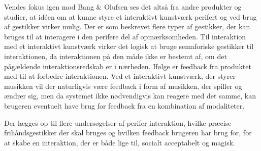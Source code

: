 Vendes fokus igen mod Bang $\&$ Olufsen ses det altså fra andre produkter og studier, at idéen om at kunne styre et interaktivt kunstværk perifert og ved brug af gestikker virker mulig. Der er som beskrevet flere typer af gestikker, der kan bruges til at interagere i den perifere del af opmærksomheden. Til interaktion med et interaktivt kunstværk virker det logisk at bruge semaforiske gestikker til interaktionen, da interaktionen på den måde ikke er bestemt af, om det pågældende interaktionsredskab er i nærheden. Ifølge \textcite[s. 21]{PDF:FacilitatingPIDesignAndEvaluation} er feedback fra produktet med til at forbedre interaktionen. Ved et interaktivt kunstværk, der styrer musikken vil der naturligvis være feedback i form af musikken, der spiller og ændrer sig, men da systemet ikke nødvendigvis kan reagere med det samme, kan brugeren eventuelt have brug for feedback fra en kombination af modaliteter. 

Der lægges op til flere undersøgelser af perifer interaktion, hvilke præcise frihåndsgestikker der skal bruges og hvilken feedback brugeren har brug for, for at skabe en interaktion, der er både lige til, socialt acceptabelt og magisk.

